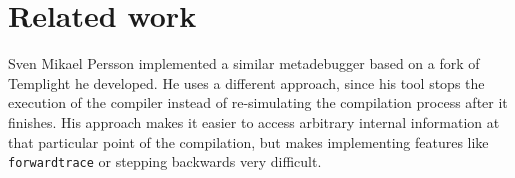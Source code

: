 
\chapter{Related work}

Sven Mikael Persson implemented a similar metadebugger based on a fork of
Templight he developed.\cite{persson-templight} He uses a different approach,
since his tool stops the execution of the compiler instead of re-simulating
the compilation process after it finishes. His approach makes it easier to
access arbitrary internal information at that particular point of the
compilation, but makes implementing features like \texttt{forwardtrace} or
stepping backwards very difficult.

